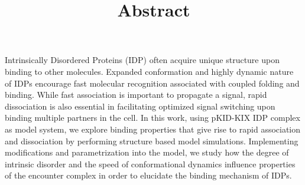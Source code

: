 \documentclass[aip,jcp,preprint,floatfix]{revtex4-1}
\title{Abstract}
\begin{document}
%

Intrinsically Disordered Proteins (IDP) often acquire unique structure upon binding to
other molecules. Expanded conformation and highly dynamic nature of IDPs encourage fast
molecular recognition associated with coupled folding and binding. While fast association is
important to propagate a signal, rapid dissociation is also essential in facilitating optimized
signal switching upon binding multiple partners in the cell. In this work, using
pKID-KIX IDP complex as model system, we explore binding properties that give
rise to rapid association and dissociation by performing structure based model simulations.
Implementing modifications and parametrization into the model, we study how the degree of
intrinsic disorder and the speed of conformational dynamics influence properties of the
encounter complex in order to elucidate the binding mechanism of IDPs.

%
\end{document}
